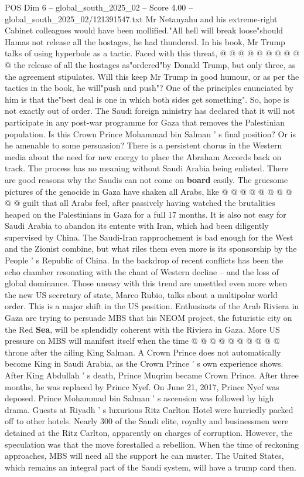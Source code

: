 \begin{textsample}{POS Dim 6 – global\_south\_2025\_02 – Score 4.00 – global\_south\_2025\_02/121391547.txt}
Mr Netanyahu and his extreme-right Cabinet colleagues would have been mollified."All hell will break loose"should Hamas not release all the hostages, he had thundered.
In his book, Mr Trump talks of using hyperbole as a tactic.
Faced with this threat, @ @ @ @ @ @ @ @ @ @ the release of all the hostages as"ordered"by Donald Trump, but only three, as the agreement stipulates.
Will this keep Mr Trump in good humour, or as per the tactics in the book, he will"push and push"?
One of the principles enunciated by him is that the"best deal is one in which both sides get something".
So, hope is not exactly out of order.
The Saudi foreign ministry has declared that it will not participate in any post-war programme for Gaza that removes the Palestinian population.
Is this Crown Prince Mohammad bin Salman ' s final position?
Or is he amenable to some persuasion?
There is a persistent chorus in the Western media about the need for new energy to place the Abraham Accords back on track.
The process has no meaning without Saudi Arabia being enlisted.
There are good reasons why the Saudis can not come on \textbf{board} easily.
The gruesome pictures of the genocide in Gaza have shaken all Arabs, like @ @ @ @ @ @ @ @ @ @ guilt that all Arabs feel, after passively having watched the brutalities heaped on the Palestinians in Gaza for a full 17 months.
It is also not easy for Saudi Arabia to abandon its entente with Iran, which had been diligently supervised by China.
The Saudi-Iran rapprochement is bad enough for the West and the Zionist combine, but what riles them even more is its sponsorship by the People ' s Republic of China.
In the backdrop of recent conflicts has been the echo chamber resonating with the chant of Western decline -- and the loss of global dominance.
Those uneasy with this trend are unsettled even more when the new US secretary of state, Marco Rubio, talks about a multipolar world order.
This is a major shift in the US position.
Enthusiasts of the Arab Riviera in Gaza are trying to persuade MBS that his NEOM project, the futuristic city on the Red \textbf{Sea}, will be splendidly coherent with the Riviera in Gaza.
More US pressure on MBS will manifest itself when the time @ @ @ @ @ @ @ @ @ @ throne after the ailing King Salman.
A Crown Prince does not automatically become King in Saudi Arabia, as the Crown Prince ' s own experience shows.
After King Abdullah ' s death, Prince Muqrim became Crown Prince.
After three months, he was replaced by Prince Nyef.
On June 21, 2017, Prince Nyef was deposed.
Prince Mohammad bin Salman ' s ascension was followed by high drama.
Guests at Riyadh ' s luxurious Ritz Carlton Hotel were hurriedly packed off to other hotels.
Nearly 300 of the Saudi elite, royalty and businessmen were detained at the Ritz Carlton, apparently on charges of corruption.
However, the speculation was that the move forestalled a rebellion.
When the time of reckoning approaches, MBS will need all the support he can muster.
The United States, which remains an integral part of the Saudi system, will have a trump card then.

\end{textsample}
